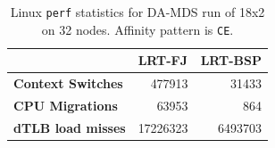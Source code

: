\documentclass[10pt, conference, compsocconf]{IEEEtran}
\begin{document}
\begin{table}[]
\centering
\caption{Linux \texttt{perf} statistics for \ac{DA-MDS} run of 18x2 on 32 nodes. Affinity pattern is \texttt{CE}.}
\label{tbl:perf-stats}
\setlength\extrarowheight{4pt}
\begin{tabular}{l|r|r|}
\cline{2-3}
                                                & \multicolumn{1}{l|}{\textbf{LRT-FJ}} & \multicolumn{1}{l|}{\textbf{LRT-BSP}} \\ \hline
\multicolumn{1}{|l|}{\textbf{Context Switches}} & 477913                               & 31433                                 \\ \hline
\multicolumn{1}{|l|}{\textbf{CPU Migrations}}   & 63953                                & 864                                 \\ \hline
\multicolumn{1}{|l|}{\textbf{dTLB load misses}} & 17226323                             & 6493703                               \\ \hline
\end{tabular}
\end{table}
\end{document}

